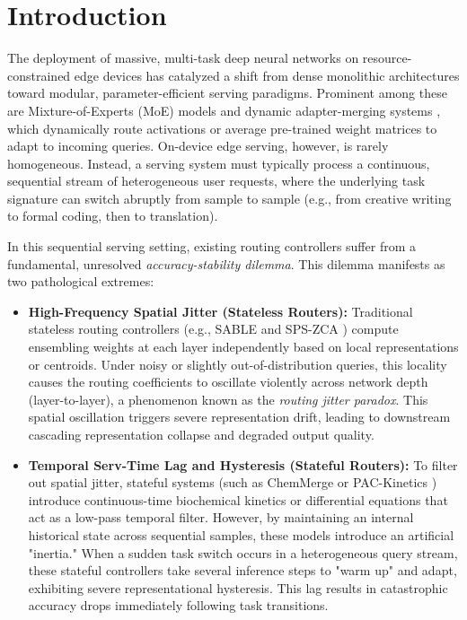 \section{Introduction}
\label{sec:intro}

The deployment of massive, multi-task deep neural networks on resource-constrained edge devices has catalyzed a shift from dense monolithic architectures toward modular, parameter-efficient serving paradigms. Prominent among these are Mixture-of-Experts (MoE) models \cite{shazeer2017outrageously, moe_gshard, switch_transformer} and dynamic adapter-merging systems \cite{lora_hu, task_arithmetic_ilharco, dynamic_adapter_selection}, which dynamically route activations or average pre-trained weight matrices to adapt to incoming queries. On-device edge serving, however, is rarely homogeneous. Instead, a serving system must typically process a continuous, sequential stream of heterogeneous user requests, where the underlying task signature can switch abruptly from sample to sample (e.g., from creative writing to formal coding, then to translation).

In this sequential serving setting, existing routing controllers suffer from a fundamental, unresolved \emph{accuracy-stability dilemma}. This dilemma manifests as two pathological extremes:
\begin{itemize}
    \item \textbf{High-Frequency Spatial Jitter (Stateless Routers):} Traditional stateless routing controllers (e.g., SABLE \cite{sable_2025} and SPS-ZCA \cite{sps_zca_2025}) compute ensembling weights at each layer independently based on local representations or centroids. Under noisy or slightly out-of-distribution queries, this locality causes the routing coefficients to oscillate violently across network depth (layer-to-layer), a phenomenon known as the \emph{routing jitter paradox}. This spatial oscillation triggers severe representation drift, leading to downstream cascading representation collapse and degraded output quality.
    \item \textbf{Temporal Serv-Time Lag and Hysteresis (Stateful Routers):} To filter out spatial jitter, stateful systems (such as ChemMerge \cite{chemmerge_2026} or PAC-Kinetics \cite{pac_kinetics_2026}) introduce continuous-time biochemical kinetics or differential equations that act as a low-pass temporal filter. However, by maintaining an internal historical state across sequential samples, these models introduce an artificial "inertia." When a sudden task switch occurs in a heterogeneous query stream, these stateful controllers take several inference steps to "warm up" and adapt, exhibiting severe representational hysteresis. This lag results in catastrophic accuracy drops immediately following task transitions.
\end{itemize}

